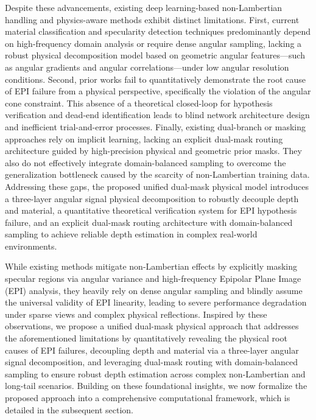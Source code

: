 Despite these advancements, existing deep learning-based non-Lambertian handling and physics-aware methods exhibit distinct limitations. First, current material classification and specularity detection techniques predominantly depend on high-frequency domain analysis or require dense angular sampling, lacking a robust physical decomposition model based on geometric angular features—such as angular gradients and angular correlations—under low angular resolution conditions. Second, prior works fail to quantitatively demonstrate the root cause of EPI failure from a physical perspective, specifically the violation of the angular cone constraint. This absence of a theoretical closed-loop for hypothesis verification and dead-end identification leads to blind network architecture design and inefficient trial-and-error processes. Finally, existing dual-branch or masking approaches rely on implicit learning, lacking an explicit dual-mask routing architecture guided by high-precision physical and geometric prior masks. They also do not effectively integrate domain-balanced sampling to overcome the generalization bottleneck caused by the scarcity of non-Lambertian training data. Addressing these gaps, the proposed unified dual-mask physical model introduces a three-layer angular signal physical decomposition to robustly decouple depth and material, a quantitative theoretical verification system for EPI hypothesis failure, and an explicit dual-mask routing architecture with domain-balanced sampling to achieve reliable depth estimation in complex real-world environments.

While existing methods mitigate non-Lambertian effects by explicitly masking specular regions via angular variance and high-frequency Epipolar Plane Image (EPI) analysis, they heavily rely on dense angular sampling and blindly assume the universal validity of EPI linearity, leading to severe performance degradation under sparse views and complex physical reflections. Inspired by these observations, we propose a unified dual-mask physical approach that addresses the aforementioned limitations by quantitatively revealing the physical root causes of EPI failures, decoupling depth and material via a three-layer angular signal decomposition, and leveraging dual-mask routing with domain-balanced sampling to ensure robust depth estimation across complex non-Lambertian and long-tail scenarios. Building on these foundational insights, we now formalize the proposed approach into a comprehensive computational framework, which is detailed in the subsequent section.